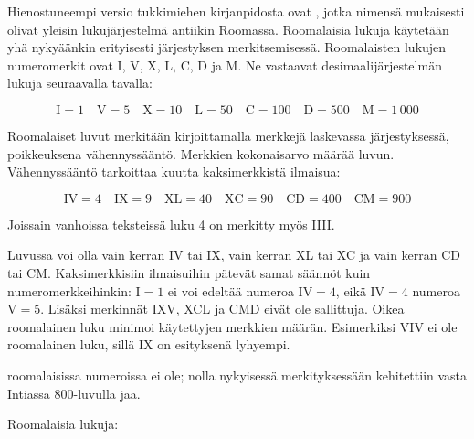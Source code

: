Hienostuneempi versio tukkimiehen kirjanpidosta ovat , jotka nimensä mukaisesti olivat yleisin lukujärjestelmä antiikin Roomassa. Roomalaisia lukuja käytetään yhä nykyäänkin erityisesti järjestyksen merkitsemisessä. Roomalaisten lukujen numeromerkit ovat I, V, X, L, C, D ja M. Ne vastaavat desimaalijärjestelmän lukuja seuraavalla tavalla:

\begin{equation*}
	\textrm{I}=1\quad
	\textrm{V}=5\quad
	\textrm{X}=10\quad
	\textrm{L}=50\quad
	\textrm{C}=100\quad
	\textrm{D}=500\quad
	\textrm{M}=1\,000
\end{equation*}

Roomalaiset luvut merkitään kirjoittamalla merkkejä laskevassa järjestyksessä, poikkeuksena vähennyssääntö. Merkkien kokonaisarvo määrää luvun. Vähennyssääntö tarkoittaa kuutta kaksimerkkistä ilmaisua:

\begin{equation*}
	\textrm{IV}=4\quad
	\textrm{IX}=9\quad
	\textrm{XL}=40\quad
	\textrm{XC}=90\quad
	\textrm{CD}=400\quad
	\textrm{CM}=900
\end{equation*}

Joissain vanhoissa teksteissä luku 4 on merkitty myös IIII.

Luvussa voi olla vain kerran IV tai IX, vain kerran XL tai XC ja vain kerran CD tai CM. Kaksimerkkisiin ilmaisuihin pätevät samat säännöt kuin numeromerkkeihinkin: I$=1$ ei voi edeltää numeroa IV$=4$, eikä IV$=4$ numeroa V$=5$. Lisäksi merkinnät IXV, XCL ja CMD eivät ole sallittuja. Oikea roomalainen luku minimoi käytettyjen merkkien määrän. Esimerkiksi VIV ei ole roomalainen luku, sillä IX on esityksenä lyhyempi.

 roomalaisissa numeroissa ei ole; nolla nykyisessä merkityksessään kehitettiin vasta Intiassa 800-luvulla jaa.

\begin{esimerkki}
	Roomalaisia lukuja:
\end{esimerkki}

